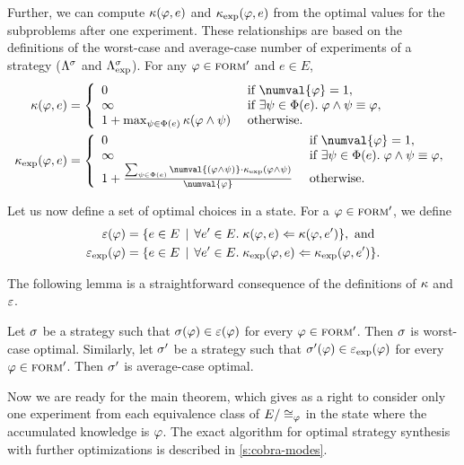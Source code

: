 Further, we can compute $\kappa(\varphi, e)$ and $\kappa_\textrm{exp}(\varphi, e)$
  from the optimal values for the subproblems after one experiment.
These relationships are based on the definitions of the worst-case
  and average-case number of experiments of a strategy
  ($\Lambda^{\sigma}$ and $\Lambda^{\sigma}_\textrm{exp}$).
For any $\varphi\in{\textsc{form}'}$ and $e\in E$,
\begin{align}
\optval(\form, e) &= \left\{\begin{array}{ll}
 0 & \textrm{ if }\numval{\form} = 1, \\
 \infty & \textrm{ if }\exists\formx\in\outcome(e).\; \form\wedge\formx\equiv\form, \\
 1 + \max_{\formx\in\outcome(e)}\optval(\form\wedge\formx) &
 \textrm{ otherwise. }
\end{array}\right.\label{optval}\\
\optvale(\form, e) &= \left\{\begin{array}{ll}
 0 & \textrm{ if }\numval{\form} = 1, \\
 \infty & \textrm{ if }\exists\formx\in\outcome(e).\; \form\wedge\formx\equiv\form, \\
 1 + \frac{\sum_{\formx\in\outcome(e)}\numval{(\form\wedge\formx)}\cdot\optvale(\form\wedge\formx)}{\numval{\form}} &
 \textrm{ otherwise. }
\end{array}\right.\label{optvale}\\
\end{align}

Let us now define a set of optimal choices in a state.
For a $\varphi\in{\textsc{form}'}$, we define
\begin{align*}
\varepsilon(\varphi) &= \{ e\in E \:\:|\:\: \forall e'\in E.\; \kappa(\varphi, e) <= \kappa(\varphi, e') \},\textrm{ and }\\
\varepsilon_\textrm{exp}(\varphi) &= \{ e\in E \:\:|\:\: \forall e'\in E.\; \kappa_\textrm{exp}(\varphi, e) <= \kappa_\textrm{exp}(\varphi, e') \}.
\end{align*}

The following lemma is a straightforward consequence of the definitions of $\kappa$ and~$\varepsilon$.

\begin{lemma}
Let $\sigma$ be a strategy such that $\sigma(\varphi)\in\varepsilon(\varphi)$ for every $\varphi\in{\textsc{form}'}$.
Then $\sigma$ is worst-case optimal.
Similarly, let $\sigma'$ be a strategy such that $\sigma'(\varphi)\in\varepsilon_\textrm{exp}(\varphi)$ for every $\varphi\in{\textsc{form}'}$.
Then $\sigma'$ is average-case optimal.
\end{lemma}

Now we are ready for the main theorem, which gives as a right to consider
  only one experiment from
  each equivalence class of $E/\cong_{\varphi}$
  in the state where the
  accumulated knowledge is $\varphi$.
The exact algorithm for optimal strategy synthesis
  with further optimizations is described in \autoref{s:cobra-modes}.

